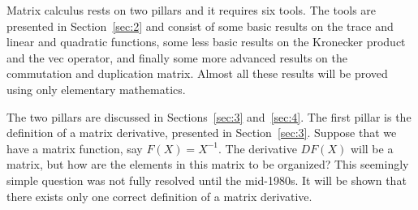 \documentclass[12pt,a4paper]{article}
\theoremstyle{definition}
\begin{document}
%
%

Matrix calculus rests on two pillars and it requires six tools. %
The tools are presented in Section~\ref{sec:2} and consist of some basic results on the trace and linear and quadratic functions, some less basic results on the Kronecker product and the vec operator, and finally some more advanced results on the commutation and duplication matrix. Almost all these results will be proved using only elementary mathematics. %

The two pillars are discussed in Sections~\ref{sec:3} and~\ref{sec:4}. The first pillar is the definition of a matrix derivative, presented in Section~\ref{sec:3}. %
Suppose that we have a matrix function, say $F(X) = X^{-1}$. The derivative $DF(X)$ will be a matrix, but how are the elements in this matrix to be organized? This seemingly simple question was not fully resolved until the mid-1980s. It will be shown that there exists only one correct definition of a matrix derivative. %
\end{document}
